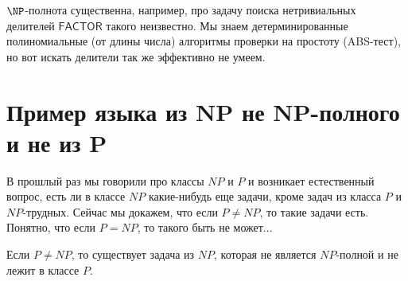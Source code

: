 	\begin{Rem}
		$\NP$-полнота существенна, например, про задачу поиска нетривиальных делителей $\mathsf{FACTOR}$ такого неизвестно.
		Мы знаем детерминированные полиномиальные (от длины числа) алгоритмы проверки на простоту (ABS-тест), но вот искать делители так же эффективно не умеем.
	\end{Rem}

\section{Пример языка из NP не NP-полного и не из P}
В прошлый раз мы говорили про классы $NP$ и $P$ и возникает естественный вопрос, есть ли в классе 
$NP$ какие-нибудь еще задачи, кроме задач из класса $P$ и $NP$-трудных. Сейчас мы докажем, 
что если $P \ne NP$, то такие задачи есть. Понятно, что если $P = NP$, то такого быть не может...

\begin{theorem}
	Если $P \ne NP$, то существует задача из $NP$, которая не 
	является $NP$-полной и не лежит в классе $P$.
\end{theorem}

